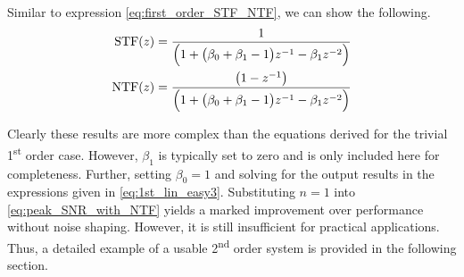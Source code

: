 Similar to expression \eqref{eq:first_order_STF_NTF}, we can show the following.
\begin{equation}\label{eq:1st_lin_4}
 \begin{split}
   \textrm{STF}(z)&=
	\frac{1}{\Bigl(1+\bigl(\beta_{0}+\beta_{1}-1\bigr)z^{-1}-\beta_{1}z^{-2}\Bigr)}\\
 \textrm{NTF}(z)&=
	\frac{\bigl(1-z^{-1}\bigr)}{\Bigl(1+\bigl(\beta_{0}+\beta_{1}-1\bigr)z^{-1}-
	\beta_{1}z^{-2}\Bigr)}
 \end{split}
\end{equation}

Clearly these results are more complex than the equations derived for the trivial
1\textsuperscript{st} order case. However, $\beta_1$ is typically set to zero and is only
included here for completeness. Further, setting $\beta_0=1$ and solving for
the output results in the expressions given in \eqref{eq:1st_lin_easy3}. Substituting
$n=1$ into \eqref{eq:peak_SNR_with_NTF} yields a marked improvement over performance
without noise shaping. However, it is still insufficient for practical applications. Thus,
a detailed example of a usable 2\textsuperscript{nd} order system is provided in the
following section.

